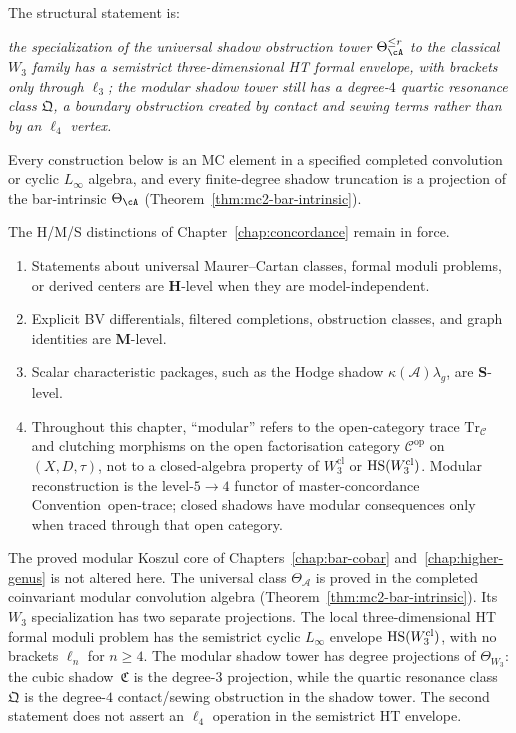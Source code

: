 The structural statement is:
\begin{center}
\emph{the specialization of the universal shadow obstruction tower
$\Theta_\cA^{\le r}$ to the classical $W_3$ family has a semistrict
three-dimensional HT formal envelope, with brackets only through
\(\ell_3\); the modular shadow tower still has a degree-$4$ quartic
resonance class \(\mathfrak Q\), a boundary obstruction created by
contact and sewing terms rather than by an $\ell_4$ vertex.}
\end{center}
Every construction below is an MC element in a specified completed
convolution or cyclic $L_\infty$ algebra, and every finite-degree
shadow truncation is a projection of the bar-intrinsic $\Theta_\cA$
(Theorem~\ref{thm:mc2-bar-intrinsic}).

\begin{convention}
\label{conv:scope-semistrict-W3}
The H/M/S distinctions of Chapter~\ref{chap:concordance} remain in force.
\begin{enumerate}[label=\textup{(\roman*)}]
 \item Statements about universal Maurer--Cartan classes, formal moduli problems, or derived centers are \textbf{H}-level when they are model-independent.
 \item Explicit BV differentials, filtered completions, obstruction classes, and graph identities are \textbf{M}-level.
 \item Scalar characteristic packages, such as the Hodge shadow $\kappa(\mathcal A)\lambda_g$, are \textbf{S}-level.
 \item Throughout this chapter, ``modular'' refers to the open-category trace $\mathrm{Tr}_{\mathcal C}$ and clutching morphisms on the open factorisation category $\mathcal C^{\mathrm{op}}$ on $(X,D,\tau)$, not to a closed-algebra property of $W_3^{\mathrm{cl}}$ or $\operatorname{HS}(W_3^{\mathrm{cl}})$. Modular reconstruction is the level-$5\to 4$ functor of master-concordance Convention~\textup{open-trace}; closed shadows have modular consequences only when traced through that open category.
\end{enumerate}
The proved modular Koszul core of
Chapters~\ref{chap:bar-cobar} and~\ref{chap:higher-genus} is not
altered here. The universal class $\Theta_{\mathcal A}$ is proved in
the completed coinvariant modular convolution algebra
(Theorem~\ref{thm:mc2-bar-intrinsic}). Its $W_3$ specialization has two
separate projections. The local three-dimensional HT formal moduli
problem has the semistrict cyclic $L_\infty$ envelope
\(\operatorname{HS}(W_3^{\mathrm{cl}})\), with no brackets $\ell_n$ for $n \ge 4$.
The modular shadow tower has degree projections of $\Theta_{W_3}$:
the cubic shadow~$\mathfrak{C}$ is the degree-$3$ projection, while the
quartic resonance class~$\mathfrak{Q}$ is the degree-$4$ contact/sewing
obstruction in the shadow tower. The second statement does not assert
an $\ell_4$ operation in the semistrict HT envelope.
\end{convention}

